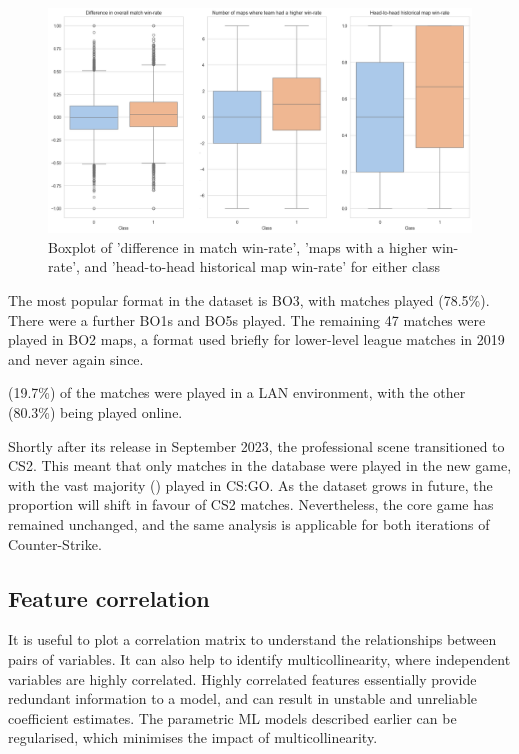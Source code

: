 \begin{figure}[h]
	\centering
	\begin{adjustbox}{center}
		\includegraphics[width=1.2\textwidth]{Figures/class-box-new-2.png}
	\end{adjustbox}
	\caption{Boxplot of 'difference in match win-rate', 'maps with a higher win-rate', and 'head-to-head historical map win-rate' for either class}
	\label{fig:win_rate_class_dist}
\end{figure}

The most popular format in the dataset is BO3, with \matchesBoThree{} matches played (78.5\%). There were a further \matchesBoOne{} BO1s and \matchesBoFive{} BO5s played. The remaining 47 matches were played in BO2 maps, a format used briefly for lower-level league matches in 2019 and never again since. 

\matchesLAN{} (19.7\%) of the matches were played in a LAN environment, with the other \matchesOnline{} (80.3\%) being played online. 

Shortly after its release in September 2023, the professional scene transitioned to CS2. This meant that only \matchesCSTwo{} matches in the database were played in the new game, with the vast majority (\matchesCSGO{}) played in CS:GO. As the dataset grows in future, the proportion will shift in favour of CS2 matches. Nevertheless, the core game has remained unchanged, and the same analysis is applicable for both iterations of Counter-Strike.

\newpage

\subsection{Feature correlation}

It is useful to plot a correlation matrix to understand the relationships between pairs of variables. It can also help to identify multicollinearity, where independent variables are highly correlated. Highly correlated features essentially provide redundant information to a model, and can result in unstable and unreliable coefficient estimates. The parametric ML models described earlier can be regularised, which minimises the impact of multicollinearity.

